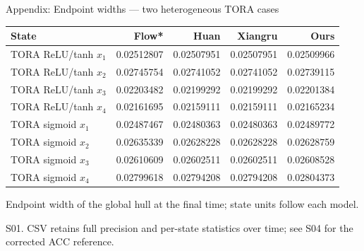 \documentclass[aspectratio=169,11pt]{beamer}
\newcommand{\src}[1]{\par\vfill{\fontsize{7}{9}\selectfont\color{gray}#1\par}}
\begin{document}
\begin{frame}[t]{Appendix: Endpoint widths — two heterogeneous TORA cases}
\relax
\relax
{\footnotesize\setlength{\tabcolsep}{3.2pt}\renewcommand{\arraystretch}{1.18}
\noindent\begin{tabular*}{\linewidth}{@{\extracolsep{\fill}}lrrrr@{}}\toprule
\textbf{State} & \textbf{Flow*} & \textbf{Huan} & \textbf{Xiangru} & \textbf{Ours}\\ \midrule
TORA ReLU/tanh \(x_1\) & 0.02512807 & 0.02507951 & 0.02507951 & 0.02509966\\
TORA ReLU/tanh \(x_2\) & 0.02745754 & 0.02741052 & 0.02741052 & 0.02739115\\
TORA ReLU/tanh \(x_3\) & 0.02203482 & 0.02199292 & 0.02199292 & 0.02201384\\
TORA ReLU/tanh \(x_4\) & 0.02161695 & 0.02159111 & 0.02159111 & 0.02165234\\
TORA sigmoid \(x_1\) & 0.02487467 & 0.02480363 & 0.02480363 & 0.02489772\\
TORA sigmoid \(x_2\) & 0.02635339 & 0.02628228 & 0.02628228 & 0.02628759\\
TORA sigmoid \(x_3\) & 0.02610609 & 0.02602511 & 0.02602511 & 0.02608528\\
TORA sigmoid \(x_4\) & 0.02799618 & 0.02794208 & 0.02794208 & 0.02804373\\
\bottomrule\end{tabular*}\par{}}\vspace{0.25cm}Endpoint width of the global hull at the final time; state units follow each model.
\src{S01. CSV retains full precision and per-state statistics over time; see S04 for the corrected ACC reference.}
\end{frame}
\end{document}
